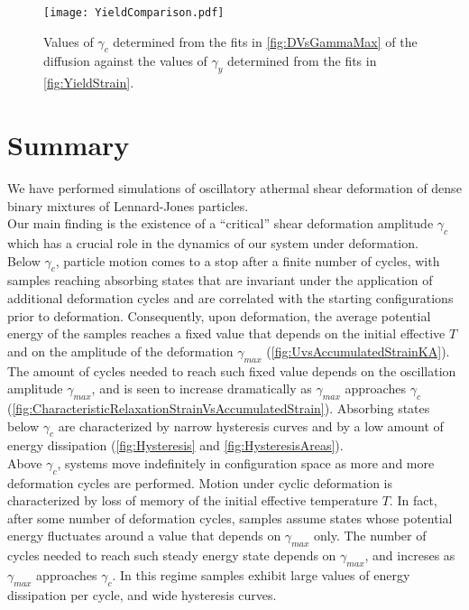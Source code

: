 \begin{figure}[!h] 
\centering 
\texttt{[image: YieldComparison.pdf]} 
\caption{Values of $\gamma_{c}$ determined from the fits in \autoref{fig:DVsGammaMax} of the diffusion against the values of $\gamma_{y}$ determined from the fits in \autoref{fig:YieldStrain}. \label{fig:YieldStrainVsCriticalStrain}}
\end{figure}

\section{Summary}
We have performed simulations of oscillatory athermal shear deformation of dense binary mixtures of Lennard-Jones particles. \\
Our main finding is the existence of a ``critical'' shear deformation amplitude $\gamma_{c}$ which has a crucial role in the dynamics of our system under deformation. \\
Below $\gamma_{c}$, particle motion comes to a stop after a finite number of cycles, with samples reaching absorbing states that are invariant under the application of additional deformation cycles and are correlated with the starting configurations prior to deformation. Consequently, upon deformation, the average potential energy of the samples reaches a fixed value that depends on the initial effective $T$ and on the amplitude of the deformation $\gamma_{max}$ (\autoref{fig:UvsAccumulatedStrainKA}). The amount of cycles needed to reach such fixed value depends on the oscillation amplitude $\gamma_{max}$, and is seen to increase dramatically as $\gamma_{max}$ approaches $\gamma_{c}$ (\autoref{fig:CharacteristicRelaxationStrainVsAccumulatedStrain}). 
Absorbing states below $\gamma_{c}$ are characterized by narrow hysteresis curves and by a low amount of energy dissipation (\autoref{fig:Hysteresis} and \autoref{fig:HysteresisAreas}).\\
Above $\gamma_{c}$, systems move indefinitely in configuration space as more and more deformation cycles are performed. Motion under cyclic deformation is characterized by loss of memory of the initial effective temperature $T$. In fact, after some number of deformation cycles, samples assume states whose potential energy fluctuates around a value that depends on $\gamma_{max}$ only. The number of cycles needed to reach such steady energy state depends on $\gamma_{max}$, and increses as $\gamma_{max}$ approaches $\gamma_{c}$. In this regime samples exhibit large values of energy dissipation per cycle, and wide hysteresis curves. \\
